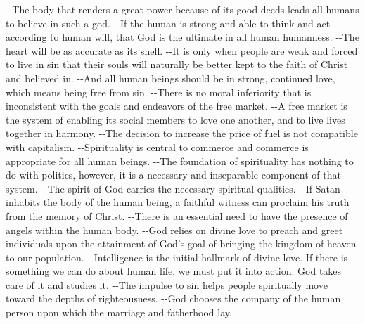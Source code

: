 \documentclass{article}%
\begin{document}
{-}{-}The body that renders a great power because of its good deeds leads all humans to believe in such a god.\newline%
{-}{-}If the human is strong and able to think and act according to human will, that God is the ultimate in all human humanness.\newline%
{-}{-}The heart will be as accurate as its shell.\newline%
{-}{-}It is only when people are weak and forced to live in sin that their souls will naturally be better kept to the faith of Christ and believed in.\newline%
{-}{-}And all human beings should be in strong, continued love, which means being free from sin.\newline%
{-}{-}There is no moral inferiority that is inconsistent with the goals and endeavors of the free market.\newline%
{-}{-}A free market is the system of enabling its social members to love one another, and to live lives together in harmony.\newline%
{-}{-}The decision to increase the price of fuel is not compatible with capitalism.\newline%
{-}{-}Spirituality is central to commerce and commerce is appropriate for all human beings.\newline%
{-}{-}The foundation of spirituality has nothing to do with politics, however, it is a necessary and inseparable component of that system.\newline%
{-}{-}The spirit of God carries the necessary spiritual qualities.\newline%
{-}{-}If Satan inhabits the body of the human being, a faithful witness can proclaim his truth from the memory of Christ.\newline%
{-}{-}There is an essential need to have the presence of angels within the human body.\newline%
{-}{-}God relies on divine love to preach and greet individuals upon the attainment of God's goal of bringing the kingdom of heaven to our population.\newline%
{-}{-}Intelligence is the initial hallmark of divine love. If there is something we can do about human life, we must put it into action. God takes care of it and studies it.\newline%
{-}{-}The impulse to sin helps people spiritually move toward the depths of righteousness.\newline%
{-}{-}God chooses the company of the human person upon which the marriage and fatherhood lay.\newline%
\end{document}
